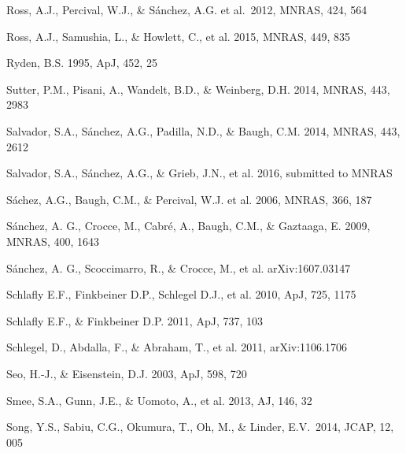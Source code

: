 \documentclass[iop]{emulateapj}
\begin{document}
\begin{thebibliography}{}
Ross, A.J., Percival, W.J., \& S{\'a}nchez, A.G. et al.\ 2012, MNRAS, 424, 564 

Ross, A.J., Samushia, L., \& Howlett, C., et al. 2015, MNRAS, 449, 835

Ryden, B.S. 1995, ApJ, 452, 25  



Sutter, P.M., Pisani, A., Wandelt, B.D., \& Weinberg, D.H. 2014, MNRAS, 443, 2983

Salvador, S.A., S\'{a}nchez, A.G., Padilla, N.D., \& Baugh, C.M. 2014, MNRAS, 443, 2612

Salvador, S.A., S\'{a}nchez, A.G., \& Grieb, J.N., et al. 2016, submitted to MNRAS

S\'{a}chez, A.G., Baugh, C.M., \& Percival, W.J. et al. 2006, MNRAS, 366, 187

S\'{a}nchez, A. G., Crocce, M., Cabr\'{e}, A., Baugh, C.M., \& Gaztaaga, E. 2009, MNRAS, 400, 1643

S\'{a}nchez, A. G., Scoccimarro, R., \& Crocce, M., et al.
arXiv:1607.03147

Schlafly E.F., Finkbeiner D.P., Schlegel D.J., et al. 2010, ApJ, 725, 1175

Schlafly E.F., \& Finkbeiner D.P. 2011, ApJ, 737, 103


Schlegel, D., Abdalla, F., \& Abraham, T., et al. 2011, arXiv:1106.1706



Seo, H.-J., \& Eisenstein, D.J. 2003, ApJ, 598, 720


Smee, S.A., Gunn, J.E., \& Uomoto, A., et al. 2013, AJ, 146, 32

Song, Y.S., Sabiu, C.G., 
Okumura, T., Oh, M., \& Linder, E.V.\ 2014, JCAP, 12, 005 


\end{thebibliography}
\end{document}
